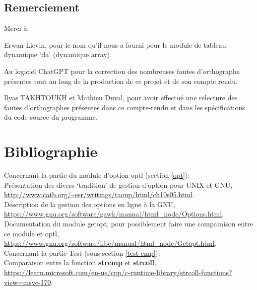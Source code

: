 \documentclass[12pt]{article}
\begin{document}
    \subsection{Remerciement}

    Merci à\@: 

    Erwan Lievin, pour le nom qu'il nous a fourni pour le module de tableau 
    dynamique `da' (dynamique array).

    Au logiciel ChatGPT pour la correction des nombreuses fautes d'orthographe 
    présentes tout au long de la production de ce projet et de son compte rendu.

    Ilyas TAKHTOUKH et Mathieu Duval, pour avoir effectué une relecture des 
    fautes d'orthographes présentes dans ce compte-rendu et dans les 
    spécifications du code source du programme.

    \newpage

    \section{Bibliographie}
        \noindent Concernant la partie du module d'option optl 
        (section \ref{opt}):\\ Présentation des divers `tradition' de gestion 
        d'option pour UNIX et GNU, 
        \url{http://www.catb.org/~esr/writings/taoup/html/ch10s05.html}.\\
        Description de la gestion des options en ligne à la GNU, 
        \url{https://www.gnu.org/software/gawk/manual/html_node/Options.html}.\\
        Documentation du module getopt, pour possiblement faire une comparaison 
        entre ce module et optl, 
        \url{https://www.gnu.org/software/libc/manual/html_node/Getopt.html}.\\
        \noindent Concernant la partie Test (sous-section \ref{test-cmp}):\\
        Comparaison entre la fonction \textbf{strcmp} et \textbf{strcoll}, 
        \url{https://learn.microsoft.com/en-us/cpp/c-runtime-library/strcoll-functions?view=msvc-170}.
\end{document}
